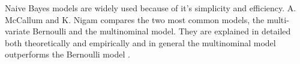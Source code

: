 	Naive Bayes models are widely used because of it's simplicity and efficiency. A. McCallum and K. Nigam compares the two most common models, the multi-variate Bernoulli and the multinominal model. They are explained in detailed both theoretically and empirically and in general the multinominal model outperforms the Bernoulli model \cite{Zhang04optimality}.